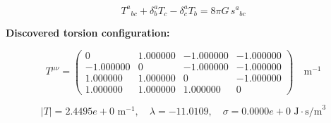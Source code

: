 
\begin{equation}
  T^a{}_{bc} + \delta^a_b T_c - \delta^a_c T_b = 8\pi G \, s^a{}_{bc}
\end{equation}

\textbf{Discovered torsion configuration:}

\begin{equation}
  T^{\mu\nu} = \begin{pmatrix}
    0 & 1.000000 & -1.000000 & -1.000000 \\
    -1.000000 & 0 & -1.000000 & -1.000000 \\
    1.000000 & 1.000000 & 0 & -1.000000 \\
    1.000000 & 1.000000 & 1.000000 & 0
  \end{pmatrix} \quad \text{m}^{-1}
\end{equation}

\begin{equation}
  |T| = 2.4495e+0 \text{ m}^{-1}, \quad
  \lambda = -11.0109, \quad
  \sigma = 0.0000e+0 \text{ J}\cdot\text{s/m}^3
\end{equation}